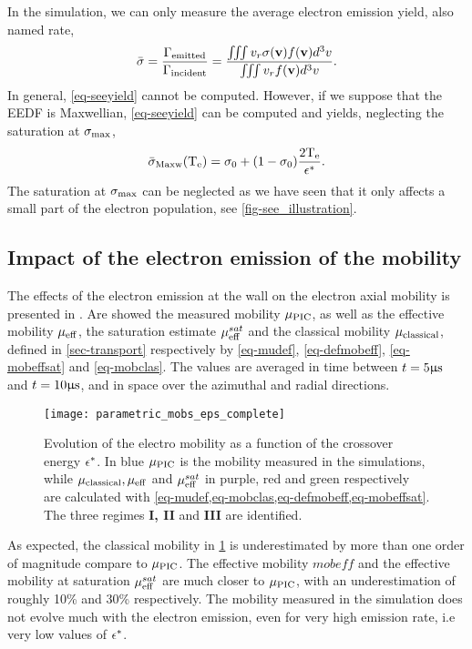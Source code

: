   In the simulation, we can only measure the average electron emission yield, also named rate, 
  \begin{equation} \label{eq-seeyield}
     \bar{\sigma }  = \frac{\Gamma_{\rm emitted}}{\Gamma_{\rm incident}} = \frac{\iiint v_r \sigma ({\mathbf v}) f({\mathbf v}) d^3v}{\iiint v_r  f({\mathbf v}) d^3v}.
  \end{equation}
  In general, \cref{eq-seeyield} cannot be computed.
  However, if we suppose that the \ac{EEDF} is Maxwellian, \cref{eq-seeyield} can be computed and yields, neglecting the saturation at $\sigma _{\rm max} $,
  \begin{equation} \label{eq-seemaxw}
     \bar{\sigma }_{\rm Maxw} (\mathrm{T_e}) = \sigma _0 + (1 - \sigma _0) \frac{2 \mathrm{T_e}}{\epsilon^{*}}.
  \end{equation}
  The saturation at $\sigma _{\rm max} $ can be neglected as we have seen that it only affects a small part of the electron population, see \cref{fig-see_illustration}.
  
  \subsection{Impact of the electron emission of the mobility} \label{subsec-param-mob}
    
  The effects of the electron emission at the wall on the electron axial mobility is presented in .
  Are showed the measured mobility $\mu_{\mathrm{PIC}}$, as well as the effective mobility $\mu_{\mathrm{eff}}$, the saturation estimate $\mu_{\mathrm{eff}}^{sat}$ and the classical mobility $\mu_{\mathrm{classical}}$, defined in \cref{sec-transport} respectively by \cref{eq-mudef}, \cref{eq-defmobeff}, \cref{eq-mobeffsat} and \cref{eq-mobclas}.
  The values are averaged in time between $t=5 \mathrm{\upmu s}$ and $t=10\mathrm{\upmu s}$, and in space over the azimuthal and radial directions.
  
  \begin{figure}[hbtp]
    \centering
    \texttt{[image: parametric\_mobs\_eps\_complete]}
    \caption{Evolution of the electro mobility as a function of the crossover energy $\epsilon^{*}$. In blue $\mu_{\mathrm{PIC}}$ is the mobility measured in the simulations, while $\mu_{\mathrm{classical}}, \mu_{\mathrm{eff}}$ and $\mu_{\mathrm{eff}}^{sat}$ in purple, red and green respectively are calculated with \cref{eq-mudef,eq-mobclas,eq-defmobeff,eq-mobeffsat}. The three regimes {\bf I, II} and {\bf III} are identified.}
    \label{fig-mob-epsstar}
  \end{figure}
  
  As expected, the classical mobility in  \cref{fig-mob-epsstar} is underestimated by more than one order of magnitude compare to $\mu_{\mathrm{PIC}}$.
  The effective mobility $mobeff$ and the effective mobility at saturation $\mu_{\mathrm{eff}}^{sat}$  are much closer to $\mu_{\mathrm{PIC}}$, with an underestimation of roughly 10\% and 30\% respectively.
  The mobility measured in the simulation does not evolve much with the electron emission, even for very high emission rate, i.e very low values of $\epsilon^{*}$.
  
